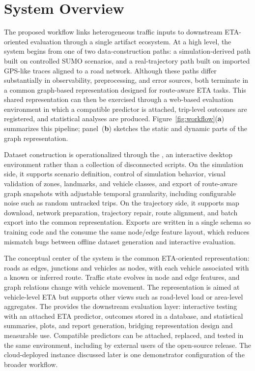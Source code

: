 \section{System Overview}\label{sec:system}

The proposed workflow links heterogeneous traffic inputs to downstream ETA-oriented evaluation through a single artifact ecosystem. At a high level, the system begins from one of two data-construction paths: a simulation-derived path built on controlled SUMO scenarios, and a real-trajectory path built on imported GPS-like traces aligned to a road network. Although these paths differ substantially in observability, preprocessing, and error sources, both terminate in a common graph-based representation designed for route-aware ETA tasks. This shared representation can then be exercised through a web-based evaluation environment in which a compatible predictor is attached, trip-level outcomes are registered, and statistical analyses are produced.
Figure~\ref{fig:workflow}(\textbf{a}) summarizes this pipeline; panel~(\textbf{b}) sketches the static and dynamic parts of the graph representation.



Dataset construction is operationalized through the \DesktopTool{}, an interactive desktop environment rather than a collection of disconnected scripts. On the simulation side, it supports scenario definition, control of simulation behavior, visual validation of zones, landmarks, and vehicle classes, and export of route-aware graph snapshots with adjustable temporal granularity, including configurable noise such as random untracked trips. On the trajectory side, it supports map download, network preparation, trajectory repair, route alignment, and batch export into the common representation.
Exports are written in a single schema so training code and the \WebApp{} consume the same node/edge feature layout, which reduces mismatch bugs between offline dataset generation and interactive evaluation.

The conceptual center of the system is the common ETA-oriented representation: roads as edges, junctions and vehicles as nodes, with each vehicle associated with a known or inferred route. Traffic state evolves in node and edge features, and graph relations change with vehicle movement. The representation is aimed at vehicle-level ETA but supports other views such as road-level load or area-level aggregates. The \WebApp{} provides the downstream evaluation layer: interactive testing with an attached ETA predictor, outcomes stored in a database, and statistical summaries, plots, and report generation, bridging representation design and measurable use. Compatible predictors can be attached, replaced, and tested in the same environment, including by external users of the open-source release. The cloud-deployed instance discussed later is one demonstrator configuration of the broader workflow.
